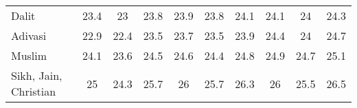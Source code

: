 \begin{tabular}{l*{9}{c}}
Dalit               &        23.4&          23&        23.8&        23.9&        23.8&        24.1&        24.1&          24&        24.3\\
Adivasi             &        22.9&        22.4&        23.5&        23.7&        23.5&        23.9&        24.4&          24&        24.7\\
Muslim              &        24.1&        23.6&        24.5&        24.6&        24.4&        24.8&        24.9&        24.7&        25.1\\
Sikh, Jain, Christian&          25&        24.3&        25.7&          26&        25.7&        26.3&          26&        25.5&        26.5\\
\bottomrule
\end{tabular}
